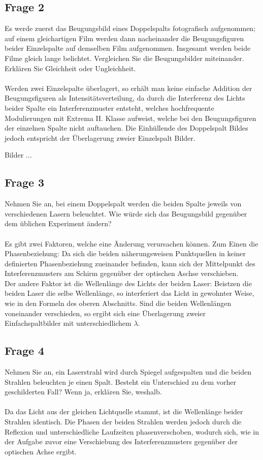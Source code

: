 \documentclass[a4paper,10pt]{scrartcl}
\begin{document}
		\subsection{Frage 2}
		Es werde zuerst das Beugungsbild eines Doppelspalts fotografisch aufgenommen; auf einem
		gleichartigen Film werden dann nacheinander die Beugungsfiguren beider Einzelspalte auf
		demselben Film aufgenommen. Insgesamt werden beide Filme gleich lange belichtet. Vergleichen
		Sie die Beugungsbilder miteinander. Erklären Sie Gleichheit oder Ungleichheit.\\
		\\
		Werden zwei Einzelspalte überlagert, so erhält man keine einfache Addition der Beugungsfiguren als Intensitätsverteilung, da durch die Interferenz des Lichts beider Spalte ein Interferenzmuster entsteht, welches hochfrequente Modulierungen mit Extrema II. Klasse aufweist, welche bei den Beugungsfiguren der einzelnen Spalte nicht auftauchen. Die Einhüllende des Doppelspalt Bildes jedoch entspricht der Überlagerung zweier Einzelspalt Bilder.

Bilder ...
		\subsection{Frage 3}
		Nehmen Sie an, bei einem Doppelspalt werden die beiden Spalte jeweils von verschiedenen
		Lasern beleuchtet. Wie würde sich das Beugungsbild gegenüber dem üblichen Experiment ändern?\\
		\\
		Es gibt zwei Faktoren, welche eine Änderung verursachen können. Zum Einen die Phasenbeziehung: Da sich die beiden näherungsweisen Punktquellen in keiner definierten Phasenbeziehung zueinander befinden, kann sich der Mittelpunkt des Interferenzmusters am Schirm gegenüber der optischen Aschse verschieben.\\
		Der andere Faktor ist die Wellenlänge des Lichts der beiden Laser: Beistzen die beiden Laser die selbe Wellenlänge, so interferiert das Licht in gewohnter Weise, wie in den Formeln des oberen Abschnitts. Sind die beiden Wellenlängen voneinander verschieden, so ergibt sich eine Überlagerung zweier Einfachspaltbilder mit unterschiedlichem \(\lambda\).
		

		\subsection{Frage 4}
		Nehmen Sie an, ein Laserstrahl wird durch Spiegel aufgespalten und die beiden Strahlen beleuchten je einen Spalt. Besteht ein Unterschied zu dem vorher geschilderten Fall? Wenn ja,	erklären Sie, weshalb.\\
		\\
		Da das Licht aus der gleichen Lichtquelle stammt, ist die Wellenlänge beider Strahlen identisch. Die Phasen der beiden Strahlen werden jedoch durch die Reflexion und unterschiedliche Laufzeiten phasenverschoben, wodurch sich, wie in der Aufgabe zuvor eine Verschiebung des Interferenzmusters gegenüber der optischen Achse ergibt.
\end{document}
